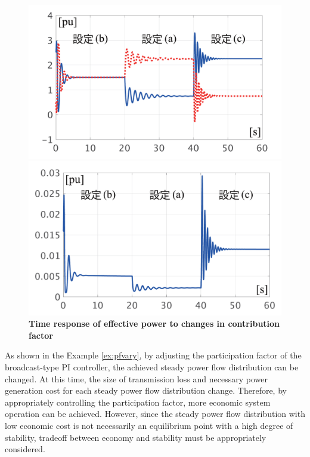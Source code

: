 \documentclass[graybox, envcountchap]{svmult}
\begin{document}
\begin{figure}[t]
  \centering
  {
  \begin{minipage}{0.49\linewidth}
    \centering
    \includegraphics[width = 1.0\linewidth]{figs/varyalphaP}
  \end{minipage}
  \begin{minipage}{0.49\linewidth}
    \centering
    \includegraphics[width = 1.0\linewidth]{figs/varyalphaloss}
  \end{minipage}
  \medskip
  \caption{\textbf{Time response of effective power to changes in contribution factor} }
  \label{fig:agcPvary}
  }
\medskip
\end{figure}


As shown in the Example \ref{ex:pfvary}, by adjusting the participation factor of the broadcast-type PI controller, the achieved steady power flow distribution can be changed.
At this time, the size of transmission loss and necessary power generation cost for each steady power flow distribution change.
Therefore, by appropriately controlling the participation factor, more economic system operation can be achieved.
However, since the steady power flow distribution with low economic cost is not necessarily an equilibrium point with a high degree of stability, tradeoff between economy and stability must be appropriately considered.
\end{document}
